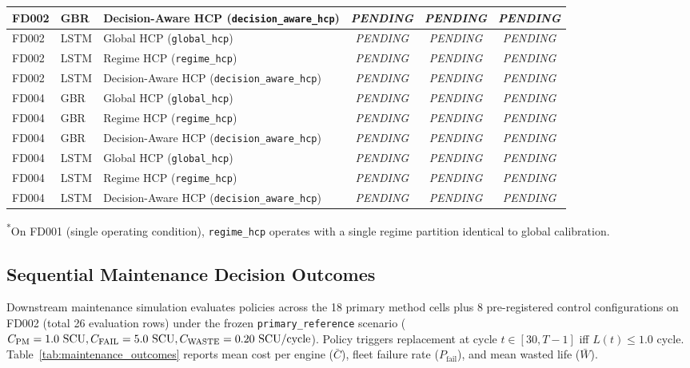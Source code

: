 \begin{table}[htbp]
\begin{tabular}{lllccc}
FD002 & GBR  & Decision-Aware HCP (\texttt{decision\_aware\_hcp}) & \textit{PENDING} & \textit{PENDING} & \textit{PENDING} \\
\midrule
FD002 & LSTM & Global HCP (\texttt{global\_hcp})             & \textit{PENDING} & \textit{PENDING} & \textit{PENDING} \\
FD002 & LSTM & Regime HCP (\texttt{regime\_hcp})             & \textit{PENDING} & \textit{PENDING} & \textit{PENDING} \\
FD002 & LSTM & Decision-Aware HCP (\texttt{decision\_aware\_hcp}) & \textit{PENDING} & \textit{PENDING} & \textit{PENDING} \\
\midrule
FD004 & GBR  & Global HCP (\texttt{global\_hcp})             & \textit{PENDING} & \textit{PENDING} & \textit{PENDING} \\
FD004 & GBR  & Regime HCP (\texttt{regime\_hcp})             & \textit{PENDING} & \textit{PENDING} & \textit{PENDING} \\
FD004 & GBR  & Decision-Aware HCP (\texttt{decision\_aware\_hcp}) & \textit{PENDING} & \textit{PENDING} & \textit{PENDING} \\
\midrule
FD004 & LSTM & Global HCP (\texttt{global\_hcp})             & \textit{PENDING} & \textit{PENDING} & \textit{PENDING} \\
FD004 & LSTM & Regime HCP (\texttt{regime\_hcp})             & \textit{PENDING} & \textit{PENDING} & \textit{PENDING} \\
FD004 & LSTM & Decision-Aware HCP (\texttt{decision\_aware\_hcp}) & \textit{PENDING} & \textit{PENDING} & \textit{PENDING} \\
\bottomrule
\end{tabular}
\begin{flushleft}
\footnotesize \textsuperscript{*}On FD001 (single operating condition), \texttt{regime\_hcp} operates with a single regime partition identical to global calibration.
\end{flushleft}
\end{table}

\subsection{Sequential Maintenance Decision Outcomes}
\label{subsec:maintenance_results}
Downstream maintenance simulation evaluates policies across the 18 primary method cells plus 8 pre-registered control configurations on FD002 (total 26 evaluation rows) under the frozen \texttt{primary\_reference} scenario ($C_{\text{PM}}=1.0~\text{SCU}, C_{\text{FAIL}}=5.0~\text{SCU}, C_{\text{WASTE}}=0.20~\text{SCU}/\text{cycle}$). Policy triggers replacement at cycle $t \in [30, T-1]$ iff $L(t) \le 1.0$ cycle. Table~\ref{tab:maintenance_outcomes} reports mean cost per engine ($\bar{C}$), fleet failure rate ($P_{\text{fail}}$), and mean wasted life ($\bar{W}$).


